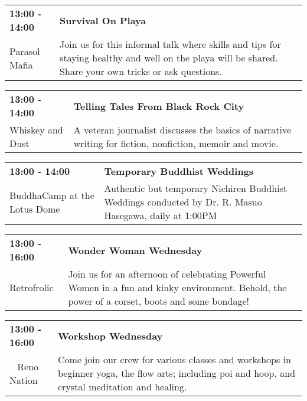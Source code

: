 \begin{tabular}{ p{1in} p{2.2in} }
    \textbf{13:00 - 14:00} & \textbf{Survival On Playa} \\
    Parasol Mafia \newline  & Join us for this informal talk where skills and tips for staying healthy and well on the playa will be shared. Share your own tricks or ask questions. \\
    \hline 
\end{tabular}
    
\begin{tabular}{ p{1in} p{2.2in} }
    \textbf{13:00 - 14:00} & \textbf{Telling Tales From Black Rock City} \\
    Whiskey and Dust \newline  & A veteran journalist discusses the basics of narrative writing for fiction, nonfiction, memoir and movie. \\
    \hline 
\end{tabular}
    
\begin{tabular}{ p{1in} p{2.2in} }
    \textbf{13:00 - 14:00} & \textbf{Temporary Buddhist Weddings} \\
    BuddhaCamp at the Lotus Dome \newline  & Authentic but temporary Nichiren Buddhist Weddings conducted by Dr. R. Masuo Hasegawa, daily at 1:00PM \\
    \hline 
\end{tabular}
    
\begin{tabular}{ p{1in} p{2.2in} }
    \textbf{13:00 - 16:00} & \textbf{Wonder Woman Wednesday} \\
    Retrofrolic \newline  & Join us for an afternoon of celebrating Powerful Women in a fun and kinky environment. Behold, the power of a corset, boots and some bondage! \\
    \hline 
\end{tabular}
    
\begin{tabular}{ p{1in} p{2.2in} }
    \textbf{13:00 - 16:00} & \textbf{Workshop Wednesday} \\
    ~ \newline Reno Nation & Come join our crew for various classes and workshops in beginner yoga, the flow arts; including poi and hoop, and crystal meditation and healing. \\
    \hline 
\end{tabular}
    

